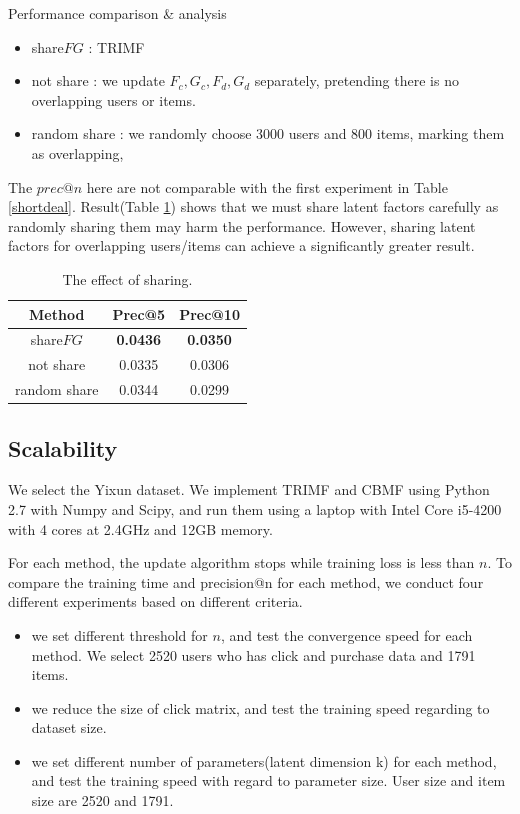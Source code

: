 \begin{subsection}{Performance comparison \& analysis}
    \begin{itemize}
    \item share$FG$ : TRIMF
    \item not share : we update $F_c, G_c, F_d, G_d$ separately, pretending there is no overlapping users or items.
    \item random share : we randomly choose 3000 users and 800 items, marking them as overlapping,
    \end{itemize}
    The $prec@n$ here are not comparable with the first experiment in Table \ref{shortdeal}. Result(Table \ref{sharing}) shows that we must share latent factors carefully as randomly sharing them may harm the performance. However, sharing latent factors for overlapping users/items can achieve a significantly greater result.

    \par{
\begin{table}
\begin{center}
  \begin{tabular}{|c|c|c|}
    \hline
    Method&Prec@5&Prec@10\\
    \hline
    share$FG$&\textbf{\color{red}0.0436}&\textbf{\color{red}0.0350}\\
    \hline
    not share&0.0335&0.0306\\
    \hline
    random share&0.0344&0.0299\\
    \hline
  \end{tabular}
\end{center}
\caption{The effect of sharing.}
\label{sharing}
\end{table}
}

\end{subsection}

\subsection{Scalability}
We select the Yixun dataset. We implement TRIMF and CBMF using Python 2.7 with Numpy and Scipy, and run them using a laptop with Intel Core i5-4200 with 4 cores at 2.4GHz and 12GB memory.

For each method, the update algorithm stops while training loss is less than $n$. To compare the training time and precision@n for each method, we conduct four different experiments based on different criteria.

\begin{itemize}

\item we set different threshold for $n$, and test the convergence speed for each method. We select 2520 users who has click and purchase data and 1791 items.
\item we reduce the size of click matrix, and test the training speed regarding to dataset size. 
\item we set different number of parameters(latent dimension k) for each method, and test the training speed with regard to parameter size. User size and item size are 2520 and 1791.
\end{itemize}

